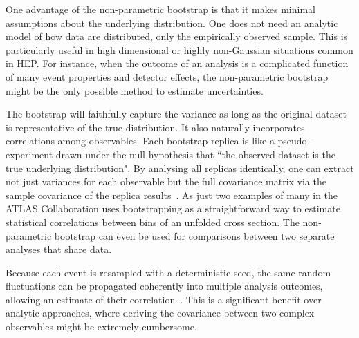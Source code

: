             One advantage of the non-parametric bootstrap is that it makes minimal assumptions about the underlying distribution.
            One does not need an analytic model of how data are distributed, only the empirically observed sample.
            This is particularly useful in high dimensional or highly non-Gaussian situations common in HEP.
            For instance, when the outcome of an analysis is a complicated function of many event properties and detector effects, the non-parametric bootstrap might be the only possible method to estimate uncertainties.
            
            The bootstrap will faithfully capture the variance as long as the original dataset is representative of the true distribution.
            It also naturally incorporates correlations among observables.
            Each bootstrap replica is like a pseudo--experiment drawn under the null hypothesis that ``the observed dataset is the true underlying distribution".
            By analysing all replicas identically, one can extract not just variances for each observable but the full covariance matrix via the sample covariance of the replica results~\cite{noauthor_evaluating_2021}.
            As just two examples of many in \cite{Aad2024Underlying-eventDetector, noauthor_studies_2021} the ATLAS Collaboration uses bootstrapping as a straightforward way to estimate statistical correlations between bins of an unfolded cross section.
            The non-parametric bootstrap can even be used for comparisons between two separate analyses that share data.
            
            Because each event is resampled with a deterministic seed, the same random fluctuations can be propagated coherently into multiple analysis outcomes, allowing an estimate of their correlation~\cite{LecuyerStochasticMethods}.
            This is a significant benefit over analytic approaches, where deriving the covariance between two complex observables might be extremely cumbersome.

